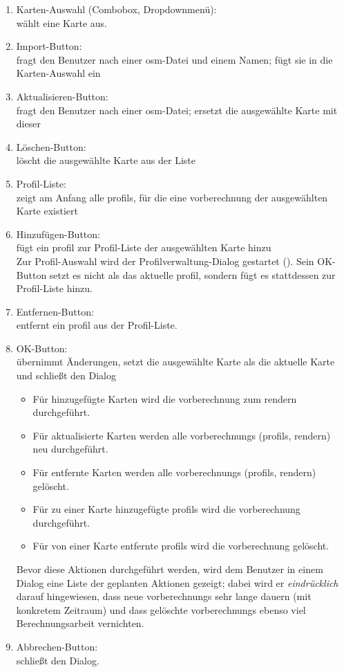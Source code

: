 \documentclass[a4paper, 11pt]{article}
\begin{document}
\begin{enumerate}
\item Karten-Auswahl (Combobox, Dropdownmenü):\\
wählt eine Karte aus.
\item Import-Button:\\
fragt den Benutzer nach einer \gls{osm}-Datei und einem Namen; fügt sie in die Karten-Auswahl ein
\item Aktualisieren-Button:\\
fragt den Benutzer nach einer \gls{osm}-Datei; ersetzt die ausgewählte Karte mit dieser
\item Löschen-Button:\\
löscht die ausgewählte Karte aus der Liste
\item Profil-Liste:\\
zeigt am Anfang alle \glspl{profil}, für die eine \gls{vorberechnung} der ausgewählten Karte existiert
\item Hinzufügen-Button:\\
fügt ein \gls{profil} zur Profil-Liste der ausgewählten Karte hinzu\\
Zur Profil-Auswahl wird der Profilverwaltung-Dialog gestartet (). Sein OK-Button setzt es nicht als das aktuelle \gls{profil}, sondern fügt es stattdessen zur Profil-Liste hinzu.
\item Entfernen-Button:\\
entfernt ein \gls{profil} aus der Profil-Liste.
\item OK-Button:\\
übernimmt Änderungen, setzt die ausgewählte Karte als die aktuelle Karte und schließt den Dialog
  \begin{itemize}
  \item Für hinzugefügte Karten wird die \gls{vorberechnung} zum \Gls{rendern} durchgeführt.
  \item Für aktualisierte Karten werden alle \glspl{vorberechnung} (\glspl{profil}, \Gls{rendern}) neu durchgeführt.
  \item Für entfernte Karten werden alle \glspl{vorberechnung} (\glspl{profil}, \Gls{rendern}) gelöscht.
  \item Für zu einer Karte hinzugefügte \glspl{profil} wird die \gls{vorberechnung} durchgeführt.
  \item Für von einer Karte entfernte \glspl{profil} wird die \gls{vorberechnung} gelöscht.
  \end{itemize}
  Bevor diese Aktionen durchgeführt werden, wird dem Benutzer in einem Dialog eine Liste der geplanten Aktionen gezeigt; dabei wird er \emph{eindrücklich} darauf hingewiesen, dass neue \glspl{vorberechnung} sehr lange dauern (mit konkretem Zeitraum) und dass gelöschte \glspl{vorberechnung} ebenso viel Berechnungsarbeit vernichten.
\item Abbrechen-Button:\\
schließt den Dialog.\\
\end{enumerate}
\end{document}
